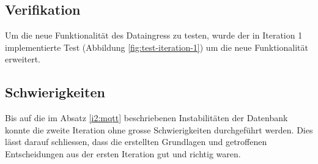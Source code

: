 \subsection{Verifikation}

Um die neue Funktionalität des Dataingress zu testen, wurde der in Iteration 1
implementierte Test (Abbildung \ref{fig:test-iteration-1}) um die neue Funktionalität
erweitert.

\subsection{Schwierigkeiten}
Bis auf die im Absatz \ref{i2:mqtt} beschriebenen Instabilitäten der Datenbank konnte
die zweite Iteration ohne grosse Schwierigkeiten durchgeführt werden.
Dies lässt darauf schliessen, dass die erstellten Grundlagen und getroffenen Entscheidungen aus 
der ersten Iteration gut und richtig waren.

